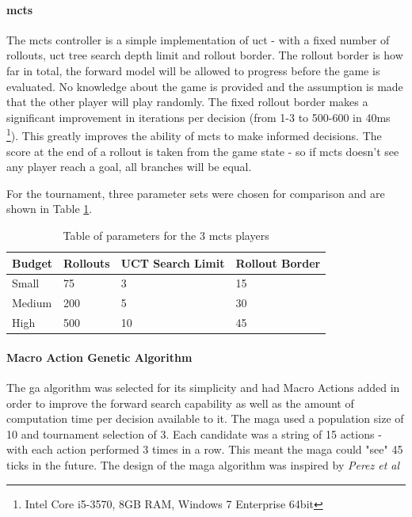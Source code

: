 \documentclass{IEEEtran}
\begin{document}
\paragraph{\gls{mcts}}
The \gls{mcts} controller is a simple implementation of \gls{uct} - with a fixed number of rollouts, \gls{uct} tree search depth limit and rollout border. The rollout border is how far in total, the forward model will be allowed to progress before the game is evaluated. No knowledge about the game is provided and the assumption is made that the other player will play randomly. The fixed rollout border makes a significant improvement in iterations per decision (from 1-3 to 500-600 in 40ms \footnote{Intel Core i5-3570, 8GB RAM, Windows 7 Enterprise 64bit}). This greatly improves the ability of \gls{mcts} to make informed decisions. The score at the end of a rollout is taken from the game state - so if \gls{mcts} doesn't see any player reach a goal, all branches will be equal.

For the tournament, three parameter sets were chosen for comparison and are shown in Table \ref{mctsTable}.
\begin{table}[!t]
\begin{center}
\begin{tabular}{|p{2.0cm}|p{2.0cm}|m{1.4cm}|m{1.4cm}|}
\hline
\textbf{Budget} & \textbf{Rollouts} & \textbf{UCT Search Limit} & \textbf{Rollout Border} \\
\hline
Small & 75 & 3 & 15 \\
Medium & 200 & 5 & 30 \\
High & 500 & 10 & 45 \\
\hline
\end{tabular}
\caption{Table of parameters for the 3 \gls{mcts} players}
\label{mctsTable}
\end{center}
\end{table}

\paragraph{Macro Action Genetic Algorithm}
The \gls{ga} algorithm was selected for its simplicity and had Macro Actions added in order to improve the forward search capability as well as the amount of computation time per decision available to it. The \gls{maga} used a population size of 10 and tournament selection of 3. Each candidate was a string of 15 actions - with each action performed 3 times in a row. This meant the \gls{maga} could "see" 45 ticks in the future. The design of the \gls{maga} algorithm was inspired by \textit{Perez et al} \cite{perez2013rolling}
\end{document}
